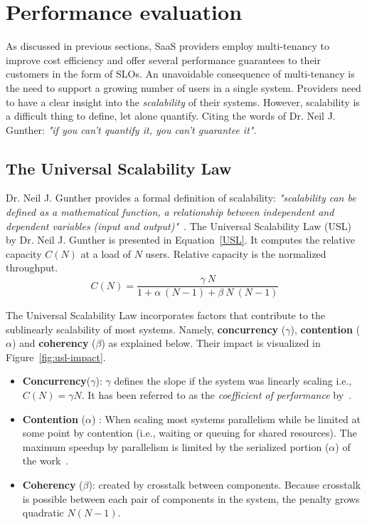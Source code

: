  
 
 
 
 
 
 
 
 \section{Performance evaluation}
As discussed in previous sections, SaaS providers employ multi-tenancy to improve  cost efficiency and offer several performance guarantees to their customers in the form of SLOs. An unavoidable consequence of multi-tenancy is the need to support a growing number of users in a single system. Providers need to have a clear insight into the \textit{scalability} of their systems. However, scalability is a difficult thing to define, let alone quantify. Citing the words of  Dr. Neil J. Gunther:  \textit{"if you can't quantify it, you can't guarantee it"}.~\cite{perfdynamics}

\subsection{The Universal Scalability Law}
\label{section-USL}
Dr. Neil J. Gunther provides a formal definition of scalability: \textit{"scalability can be defined as a mathematical function, a relationship between independent and dependent variables (input and output)"~\cite{perfdynamics}}. The Universal Scalability Law (USL) by Dr. Neil J. Gunther is presented in Equation~\ref{USL}. It computes the relative capacity $C(N)$ at a load of $N$ users. Relative capacity is the normalized throughput.
\begin{equation}
\label{USL}
C(N) = \frac{\gamma~N}{1 + \alpha~(N-1) + \beta~N~(N-1)}
\end{equation}

The Universal Scalability Law incorporates factors that contribute to the sublinearly scalability of most systems. Namely, \textbf{concurrency} ($\gamma$), \textbf{contention} ($\alpha$) and \textbf{coherency} ($\beta$) as explained below. Their impact is visualized in Figure~\ref{fig:usl-impact}.

\begin{itemize}
    \item \textbf{Concurrency}($\gamma$): $\gamma$ defines the slope if the system was linearly scaling i.e., $C(N) = \gamma N$. It has been referred to as the \textit{coefficient of performance} by~\cite{schwarz2015practical}.
    \item \textbf{Contention} ($ \alpha $) : When scaling most systems parallelism while be limited at some point by contention (i.e., waiting or queuing for shared resources). The maximum speedup by parallelism is limited by the serialized portion ($\alpha$) of the work~\cite{schwarz2015practical}. 
    \item \textbf{Coherency} ($\beta$): created by crosstalk between components. Because crosstalk is possible between each pair of components in the system, the penalty grows quadratic $N(N-1)$.~\cite{schwarz2015practical}
    
\end{itemize}

